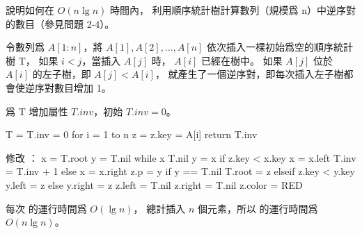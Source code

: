 \startEXERCISE
說明如何在 $O(n\lg n)$ 時間內，
利用順序統計樹計算數列（規模爲 n）中逆序對的數目（參見問題 2-4）。
\stopEXERCISE

\startANSWER
令數列爲 $A[1:n]$，將 $A[1],A[2],\dots,A[n]$ 依次插入一棵初始爲空的順序統計樹 T，
如果 $i < j$，當插入 $A[j]$ 時， $A[i]$ 已經在樹中。
如果 $A[j]$ 位於 $A[i]$ 的左子樹，即 $A[j]<A[i]$，
就產生了一個逆序對，即每次插入左子樹都會使逆序對數目增加 1。

爲 T 增加屬性 $T.inv$，初始 $T.inv = 0$。

\startCLRSCODE
T = 
T.inv = 0
for i = 1 to n
	z = 
	z.key = A[i]
return T.inv
\stopCLRSCODE

修改 ：
\startCLRSCODE
x = T.root
y = T.nil
while x \ne T.nil
	y = x
	if z.key < x.key
		x = x.left
		T.inv = T.inv + 1
	else
		x = x.right
z.p = y
if y == T.nil
	T.root = z
elseif z.key < y.key
	y.left = z
else
	y.right = z
z.left = T.nil
z.right = T.nil
z.color = RED
\stopCLRSCODE

每次  的運行時間爲 $O(\lg n)$，
總計插入 $n$ 個元素，所以  的運行時間爲 $O(n\lg n)$。
\stopANSWER
